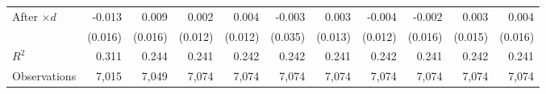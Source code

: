 {\begin{tabular}{l*{10}{D{.}{.}{-1}}}
After \ensuremath{\times d}&      -0.013         &       0.009         &       0.002         &       0.004         &      -0.003         &       0.003         &      -0.004         &      -0.002         &       0.003         &       0.004         \\
                    &     (0.016)         &     (0.016)         &     (0.012)         &     (0.012)         &     (0.035)         &     (0.013)         &     (0.012)         &     (0.016)         &     (0.015)         &     (0.016)         \\
\midrule
\ensuremath{R^2}    &       0.311         &       0.244         &       0.241         &       0.242         &       0.242         &       0.241         &       0.242         &       0.241         &       0.242         &       0.241         \\
Observations        &       7,015         &       7,049         &       7,074         &       7,074         &       7,074         &       7,074         &       7,074         &       7,074         &       7,074         &       7,074         \\
\bottomrule
\end{tabular}
}
